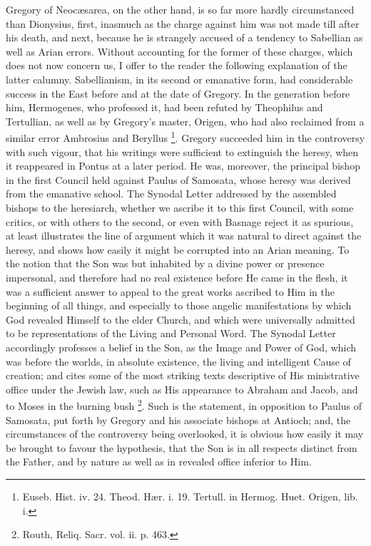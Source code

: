 Gregory of Neocæsarea, on the other hand, is so far more hardly
circumstanced than Dionysius, first, inasmuch as the charge against
him was not made till after his death, and next, because he is
strangely accused of a tendency to Sabellian as well as Arian errors.
Without accounting for the former of these charges, which does not now
concern us, I offer to the reader the following explanation of the
latter calumny. Sabellianism, in its second or emanative form, had
considerable success in the East before and at the date of Gregory. In
the generation before him, Hermogenes, who professed it, had been
refuted by Theophilus and Tertullian, as well as by Gregory's master,
Origen, who had also reclaimed from a similar error Ambrosius and
Beryllus \footnote{Euseb. Hist. iv. 24. Theod. Hær. i. 19.
Tertull. in Hermog. Huet. Origen, lib. i.}. Gregory
succeeded him in the controversy with such vigour, that his writings
were sufficient to extinguish the heresy, when it reappeared in Pontus
at a later period. He was, moreover, the principal bishop in the first
Council held against Paulus of Samosata, whose heresy was derived from
the emanative school. The Synodal Letter addressed by the assembled
bishops to the heresiarch, whether we ascribe it to this first
Council, with some critics, or with others to the second, or even with
Basnage reject it as spurious, at least illustrates the line of
argument which it was natural to direct against the heresy, and shows
how easily it might be corrupted into an Arian meaning. To the notion
that the Son was but inhabited by a divine power or presence
impersonal, and therefore had no real existence before He came in the
flesh, it was a sufficient answer to appeal to the great works
ascribed to Him in the beginning of all things, and especially to
those angelic manifestations by which God revealed Himself to the
elder Church, and which were universally admitted to be
representations of the Living and Personal Word. The Synodal Letter
accordingly professes a belief in the Son, as the Image and Power of
God, which was before the worlds, in absolute existence, the living
and intelligent Cause of creation; and cites some of the most striking
texts descriptive of His ministrative office under the Jewish law,
such as His appearance to Abraham and Jacob, and to Moses in the
burning bush \footnote{Routh, Reliq. Sacr. vol. ii. p. 463.}. Such is
the statement, in opposition to Paulus of Samosata, put forth by
Gregory and his associate bishops at Antioch; and, the circumstances
of the controversy being overlooked, it is obvious how easily it may
be brought to favour the hypothesis, that the Son is in all respects
distinct from the Father, and by nature as well as in revealed office
inferior to Him.

